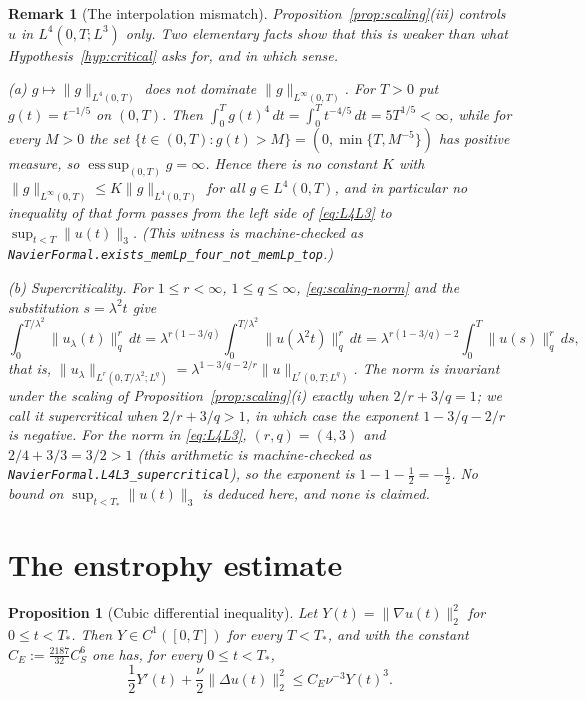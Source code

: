 \documentclass[11pt]{article}
\newtheorem{proposition}[theorem]{Proposition}
\newtheorem{remark}[theorem]{Remark}
\theoremstyle{definition}
\theoremstyle{plain}
\newcommand{\norm}[1]{\lVert #1\rVert}
\begin{document}
\begin{remark}[The interpolation mismatch]\label{rem:mismatch}
Proposition~\ref{prop:scaling}(iii) controls $u$ in $L^4(0,T;L^3)$ only.
Two elementary facts show that this is weaker than what
Hypothesis~\ref{hyp:critical} asks for, and in which sense.

(a) \emph{$g\mapsto\|g\|_{L^4(0,T)}$ does not dominate
$\|g\|_{L^\infty(0,T)}$.}  For $T>0$ put $g(t)=t^{-1/5}$ on $(0,T)$.  Then
$\int_0^Tg(t)^4\,dt=\int_0^Tt^{-4/5}\,dt=5T^{1/5}<\infty$, while for every
$M>0$ the set $\{t\in(0,T):g(t)>M\}=(0,\min\{T,M^{-5}\})$ has positive
measure, so $\operatorname*{ess\,sup}_{(0,T)}g=\infty$.  Hence there is no
constant $K$ with $\|g\|_{L^\infty(0,T)}\le K\|g\|_{L^4(0,T)}$ for all
$g\in L^4(0,T)$, and in particular no inequality of that form passes from
the left side of \eqref{eq:L4L3} to $\sup_{t<T}\|u(t)\|_3$.  (This
witness is machine-checked as
\texttt{NavierFormal.\allowbreak exists\_memLp\_four\_not\_memLp\_top}.)

(b) \emph{Supercriticality.}  For $1\le r<\infty$, $1\le q\le\infty$,
\eqref{eq:scaling-norm} and the substitution $s=\lambda^2t$ give
\begin{equation}\label{eq:LPS}
 \int_0^{T/\lambda^2}\|u_\lambda(t)\|_q^r\,dt
 =\lambda^{r(1-3/q)}\int_0^{T/\lambda^2}\|u(\lambda^2t)\|_q^r\,dt
 =\lambda^{r(1-3/q)-2}\int_0^T\|u(s)\|_q^r\,ds,
\end{equation}
that is, $\|u_\lambda\|_{L^r(0,T/\lambda^2;L^q)}
=\lambda^{1-3/q-2/r}\|u\|_{L^r(0,T;L^q)}$.  The norm is invariant under the
scaling of Proposition~\ref{prop:scaling}(i) exactly when $2/r+3/q=1$; we
call it supercritical when $2/r+3/q>1$, in which case the exponent
$1-3/q-2/r$ is negative.  For the norm in \eqref{eq:L4L3}, $(r,q)=(4,3)$
and $2/4+3/3=3/2>1$ (this arithmetic is machine-checked as
\texttt{NavierFormal.\allowbreak L4L3\_supercritical}), so the exponent is
$1-1-\tfrac12=-\tfrac12$.  No bound on $\sup_{t<T_*}\|u(t)\|_3$ is deduced
here, and none is claimed.
\end{remark}

\section{The enstrophy estimate}

\begin{proposition}[Cubic differential inequality]\label{prop:enstrophy}
Let $Y(t)=\norm{\nabla u(t)}_2^2$ for $0\le t<T_*$.  Then $Y\in C^1([0,T])$
for every $T<T_*$, and with the constant
$C_E:=\tfrac{2187}{32}C_S^6$ one has, for every $0\le t<T_*$,
\begin{equation}\label{eq:enstrophy}
 \frac12Y'(t)+\frac\nu2\norm{\Delta u(t)}_2^2
 \le C_E\nu^{-3}Y(t)^3.
\end{equation}
\end{proposition}
\end{document}
